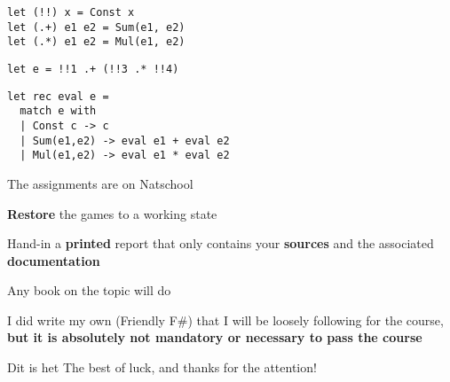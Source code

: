 \documentclass{beamer}
\begin{document}
\begin{frame}[fragile]
\begin{lstlisting}
let (!!) x = Const x
let (.+) e1 e2 = Sum(e1, e2)
let (.*) e1 e2 = Mul(e1, e2)
\end{lstlisting}
\end{frame}

\begin{frame}[fragile]
\begin{lstlisting}
let e = !!1 .+ (!!3 .* !!4)
\end{lstlisting}
\end{frame}

\begin{frame}[fragile]
\begin{lstlisting}
let rec eval e =
  match e with
  | Const c -> c
  | Sum(e1,e2) -> eval e1 + eval e2
  | Mul(e1,e2) -> eval e1 * eval e2
\end{lstlisting}
\end{frame}

\begin{slide}{
\item The assignments are on Natschool
\item \textbf{Restore} the games to a working state
\item Hand-in a \textbf{printed} report that only contains your \textbf{sources} and the associated \textbf{documentation}
}\end{slide}

\begin{slide}{
\item Any book on the topic will do
\item I did write my own (Friendly F\#) that I will be loosely following for the course, \textbf{but it is absolutely not mandatory or necessary to pass the course}
}\end{slide}


\begin{frame}{Dit is het}
\center
\fontsize{18pt}{7.2}\selectfont
The best of luck, and thanks for the attention!
\end{frame}
\end{document}
